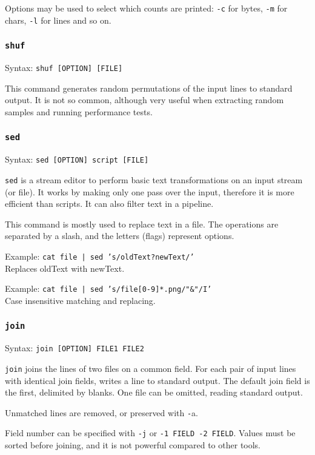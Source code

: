 Options may be used to select which counts are printed: \texttt{-c} for bytes, \texttt{-m} for chars, \texttt{-l} for lines and so on.

\subsubsection{\texttt{shuf}}
Syntax: \texttt{shuf [OPTION] [FILE]}

This command generates random permutations of the input lines to standard output. It is not so common, although very useful when extracting random samples and running performance tests.

\subsubsection{\texttt{sed}}
Syntax: \texttt{sed [OPTION] {script} [FILE]}

\texttt{sed} is a stream editor to perform basic text transformations on an input stream (or file). It works by making only one pass over the input, therefore it is more efficient than scripts. It can also filter text in a pipeline.

This command is mostly used to replace text in a file. The operations are separated by a slash, and the letters (flags) represent options.

Example: \texttt{cat file | sed 's/oldText?newText/'} \\
Replaces oldText with newText.

Example: \texttt{cat file | sed 's/file[0-9]*.png/"\&"/I'} \\
Case insensitive matching and replacing.

\subsubsection{\texttt{join}}
Syntax: \texttt{join [OPTION] FILE1 FILE2}

\texttt{join} joins the lines of two files on a common field. For each pair of input lines with identical join fields, writes a line to standard output. The default join field is the first, delimited by blanks. One file can be omitted, reading standard output.

Unmatched lines are removed, or preserved with \texttt{-}a.

Field number can be specified with \texttt{-j} or \texttt{-1 FIELD -2 FIELD}. Values must be sorted before joining, and it is not powerful compared to other tools.

